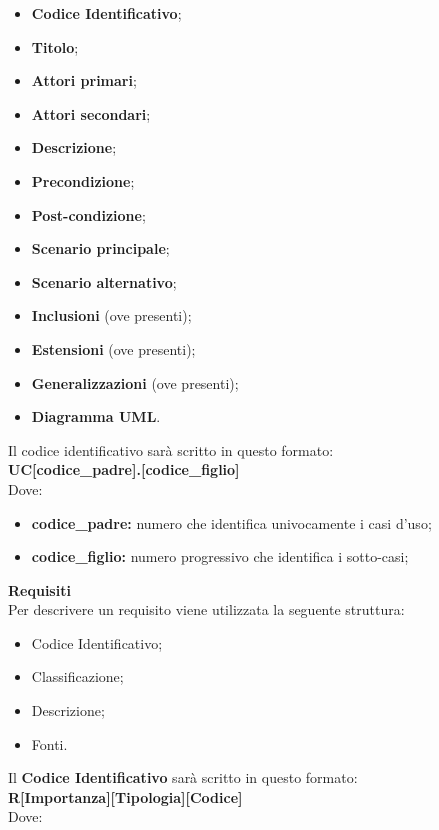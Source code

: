 \begin{itemize}
	\item \textbf{Codice Identificativo};
	\item \textbf{Titolo};
	\item \textbf{Attori primari};
	\item \textbf{Attori secondari};
	\item \textbf{Descrizione};
	\item \textbf{Precondizione};
	\item \textbf{Post-condizione};
	\item \textbf{Scenario principale};
	\item \textbf{Scenario alternativo};
	\item \textbf{Inclusioni} (ove presenti);
	\item \textbf{Estensioni} (ove presenti);
	\item \textbf{Generalizzazioni} (ove presenti);
	\item \textbf{Diagramma UML}.	
\end{itemize}
Il codice identificativo sarà scritto in questo formato: \\
\textbf{UC[codice\_padre].[codice\_figlio]} \\
Dove:
\begin{itemize}
	\item \textbf{codice\_padre:} numero che identifica univocamente i casi d'uso;
	\item \textbf{codice\_figlio:} numero progressivo che identifica i sotto-casi;
\end{itemize}
\textbf{Requisiti}\\%
Per descrivere un requisito viene utilizzata la seguente struttura:
\begin{itemize}
	\item Codice Identificativo;
	\item Classificazione;
	\item Descrizione;
	\item Fonti.
\end{itemize} 
Il \textbf{Codice Identificativo} sarà scritto in questo formato: \\
\textbf{R[Importanza][Tipologia][Codice]} \\
Dove:
